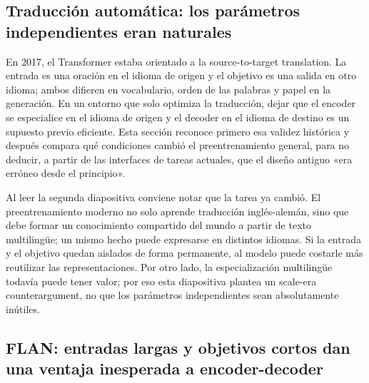 \subsection{Traducción automática: los parámetros independientes eran naturales}

En 2017, el Transformer estaba orientado a la source-to-target translation. La entrada es una oración en el idioma de origen y el objetivo es una salida en otro idioma; ambos difieren en vocabulario, orden de las palabras y papel en la generación. En un entorno que solo optimiza la traducción, dejar que el encoder se especialice en el idioma de origen y el decoder en el idioma de destino es un supuesto previo eficiente. Esta sección reconoce primero esa validez histórica y después compara qué condiciones cambió el preentrenamiento general, para no deducir, a partir de las interfaces de tareas actuales, que el diseño antiguo «era erróneo desde el principio».



Al leer la segunda diapositiva conviene notar que la tarea ya cambió. El preentrenamiento moderno no solo aprende traducción inglés-alemán, sino que debe formar un conocimiento compartido del mundo a partir de texto multilingüe; un mismo hecho puede expresarse en distintos idiomas. Si la entrada y el objetivo quedan aislados de forma permanente, al modelo puede costarle más reutilizar las representaciones. Por otro lado, la especialización multilingüe todavía puede tener valor; por eso esta diapositiva plantea un scale-era counterargument, no que los parámetros independientes sean absolutamente inútiles.


\subsection{FLAN: entradas largas y objetivos cortos dan una ventaja inesperada a encoder-decoder}

